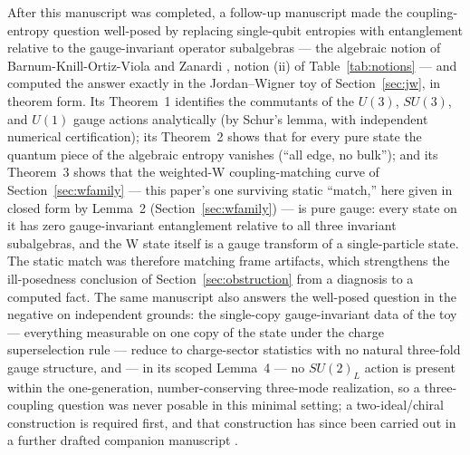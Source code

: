 \documentclass[11pt]{article}
\begin{document}
After this manuscript was completed, a follow-up manuscript \cite{paper2} made the coupling-entropy question well-posed by replacing single-qubit entropies with entanglement relative to the gauge-invariant operator subalgebras --- the algebraic notion of Barnum-Knill-Ortiz-Viola \cite{barnum} and Zanardi \cite{zanardi}, notion (ii) of Table~\ref{tab:notions} --- and computed the answer exactly in the Jordan--Wigner toy of Section~\ref{sec:jw}, in theorem form. Its Theorem~1 identifies the commutants of the $U(3)$, $SU(3)$, and $U(1)$ gauge actions analytically (by Schur's lemma, with independent numerical certification); its Theorem~2 shows that for every pure state the quantum piece of the algebraic entropy vanishes (``all edge, no bulk''); and its Theorem~3 shows that the weighted-W coupling-matching curve of Section~\ref{sec:wfamily} --- this paper's one surviving static ``match,'' here given in closed form by Lemma~2 (Section~\ref{sec:wfamily}) --- is pure gauge: every state on it has zero gauge-invariant entanglement relative to all three invariant subalgebras, and the W state itself is a gauge transform of a single-particle state. The static match was therefore matching frame artifacts, which strengthens the ill-posedness conclusion of Section~\ref{sec:obstruction} from a diagnosis to a computed fact. The same manuscript also answers the well-posed question in the negative on independent grounds: the single-copy gauge-invariant data of the toy --- everything measurable on one copy of the state under the charge superselection rule --- reduce to charge-sector statistics with no natural three-fold gauge structure, and --- in its scoped Lemma~4 --- no $SU(2)_L$ action is present within the one-generation, number-conserving three-mode realization, so a three-coupling question was never posable in this minimal setting; a two-ideal/chiral construction is required first, and that construction has since been carried out in a further drafted companion manuscript \cite{paper4}.
\end{document}
